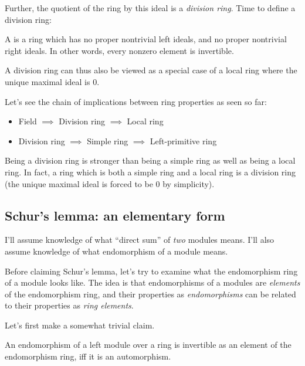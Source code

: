 \documentclass[a4paper]{amsart}
\begin{document}
Further, the quotient of the ring by this ideal is a {\em division
  ring}. Time to define a division ring:

\begin{definer}
  A  is a ring which has no proper
  nontrivial left ideals, and no proper nontrivial right ideals. In
  other words, every nonzero element is invertible.
\end{definer}

A division ring can thus also be viewed as a special case of a local ring
where the unique maximal ideal is $0$.

Let's see the chain of implications between ring properties as seen so far:

\begin{itemize}

\item Field $\implies$ Division ring $\implies$ Local ring

\item Division ring $\implies$ Simple ring $\implies$ Left-primitive ring

\end{itemize}

Being a division ring is stronger than being a simple ring as well as
being a local ring. In fact, a ring which is both a simple ring and a
local ring is a division ring (the unique maximal  ideal is
forced to be $0$ by simplicity).

\subsection{Schur's lemma: an elementary form}

I'll assume knowledge of what ``direct sum'' of {\em two} modules
means.  I'll also assume knowledge of what endomorphism of a module
means.

Before claiming Schur's lemma, let's try to examine what the
endomorphism ring of a module looks like. The idea is that
endomorphisms of a modules are {\em elements} of the endomorphism
ring, and their properties as {\em endomorphisms} can be related to
their properties as {\em ring elements}. 

Let's first make a somewhat trivial claim.

\begin{claimer}
  An endomorphism of a left module over a ring is invertible as an
  element of the endomorphism ring, iff it is an automorphism.
\end{claimer}
\end{document}
